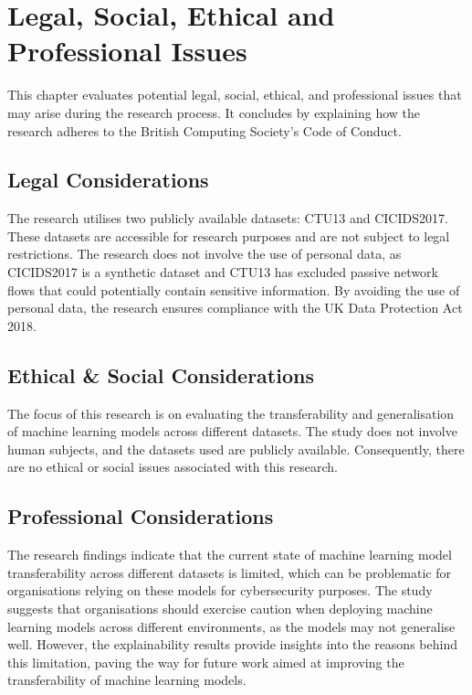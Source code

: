 \chapter{Legal, Social, Ethical and Professional Issues}

This chapter evaluates potential legal, social, ethical, and professional issues that may arise during the research process. It concludes by explaining how the research adheres to the British Computing Society's Code of Conduct.

\section{Legal Considerations}

The research utilises two publicly available datasets: CTU13\cite{garcia2014empirical} and CICIDS2017\cite{sharafaldin2018toward}. These datasets are accessible for research purposes and are not subject to legal restrictions. The research does not involve the use of personal data, as CICIDS2017 is a synthetic dataset and CTU13 has excluded passive network flows that could potentially contain sensitive information. By avoiding the use of personal data, the research ensures compliance with the UK Data Protection Act 2018.

\section{Ethical \& Social Considerations}

The focus of this research is on evaluating the transferability and generalisation of machine learning models across different datasets. The study does not involve human subjects, and the datasets used are publicly available. Consequently, there are no ethical or social issues associated with this research.

\section{Professional Considerations}

The research findings indicate that the current state of machine learning model transferability across different datasets is limited, which can be problematic for organisations relying on these models for cybersecurity purposes. The study suggests that organisations should exercise caution when deploying machine learning models across different environments, as the models may not generalise well. However, the explainability results provide insights into the reasons behind this limitation, paving the way for future work aimed at improving the transferability of machine learning models.

